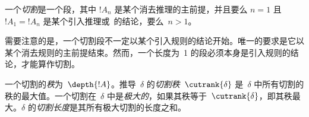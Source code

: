 \documentclass[../../../include/open-logic-section]{subfiles}
\begin{document}
\begin{defn}
一个\emph{切割}是一个段，其中 $!A_n$ 是某个消去推理的主前提，并且要么 $n=1$ 且 $!A_1 = !A_n$ 是某个引入推理或~\FalseInt 的结论，要么~$n>1$。
\end{defn}

需要注意的是，一个切割段不一定以某个引入规则的结论开始。唯一的要求是它以某个消去规则的主前提结束。然而，一个长度为~1 的段必须本身是引入规则的结论，才能算作切割。

\begin{defn}
一个切割的\emph{秩}为~$\depth{!A}$。推导~$\delta$ 的\emph{切割秩}~$\cutrank{\delta}$ 是~$\delta$ 中所有切割的秩的最大值。一个切割在~$\delta$ 中是\emph{极大的}，如果其秩等于~$\cutrank{\delta}$，即其秩最大。$\delta$ 的\emph{切割长度}是其所有极大切割的长度之和。
\end{defn}
\end{document}

